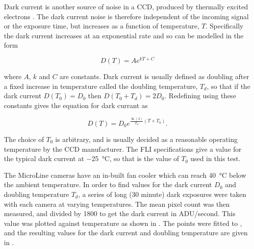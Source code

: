 \begin{colsection}
\begin{colsection}
Dark current is another source of noise in a CCD, produced by thermally excited electrons \citep{dark_current}. The dark current noise is therefore independent of the incoming signal or the exposure time, but increases as a function of temperature, $T$. Specifically the dark current increases at an exponential rate and so can be modelled in the form

\begin{equation}
    D(T) = Ae^{kT + C}
    \label{eq:dark_model}
\end{equation}

where $A$, $k$ and $C$ are constants. Dark current is usually defined as doubling after a fixed increase in temperature called the doubling temperature, $T_d$, so that if the dark current $D(T_0) = D_0$ then $D(T_0 + T_d) = 2D_0$. Redefining  using these constants gives the equation for dark currant as

\begin{equation}
    D(T) = D_0 e^{\frac{\ln(2)}{T_d}(T + T_0)}.
    \label{eq:dc}
\end{equation}

The choice of $T_0$ is arbitrary, and is usually decided as a reasonable operating temperature by the CCD manufacturer. The FLI specifications give a value for the typical dark current at \SI{-25}{\celsius}, so that is the value of $T_0$ used in this test.

The MicroLine cameras have an in-built fan cooler which can reach \SI{40}{\celsius} below the ambient temperature. In order to find values for the dark current $D_0$ and doubling temperature $T_d$, a series of long (30 minute) dark exposures were taken with each camera at varying temperatures. The mean pixel count was then measured, and divided by 1800 to get the dark current in ADU/second. This value was plotted against temperature as shown in . The points were fitted to , and the resulting values for the dark current and doubling temperature are given in .

\newpage


\end{colsection}
\end{colsection}
